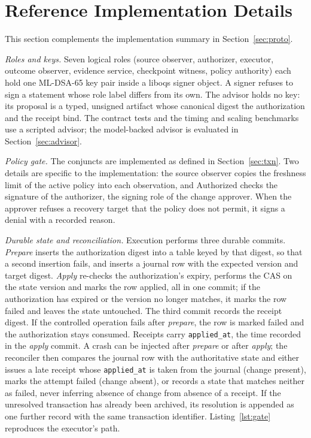 \documentclass[journal]{IEEEtran}
\newcommand{\Authorized}{\mathrm{Authorized}}
\newcommand{\code}[1]{\texttt{\footnotesize #1}}
\begin{document}
\section{Reference Implementation Details}
\label{s:impl}
This section complements the implementation summary in Section~\ref{sec:proto}.

\emph{Roles and keys.} Seven logical roles (source observer, authorizer, executor, outcome observer, evidence service, checkpoint witness, policy authority) each hold one ML-DSA-65 key pair inside a liboqs signer object. A signer refuses to sign a statement whose role label differs from its own. The advisor holds no key: its proposal is a typed, unsigned artifact whose canonical digest the authorization and the receipt bind. The contract tests and the timing and scaling benchmarks use a scripted advisor; the model-backed advisor is evaluated in Section~\ref{sec:advisor}.

\emph{Policy gate.} The conjuncts are implemented as defined in Section~\ref{sec:txn}. Two details are specific to the implementation: the source observer copies the freshness limit of the active policy into each observation, and $\Authorized$ checks the signature of the authorizer, the signing role of the change approver. When the approver refuses a recovery target that the policy does not permit, it signs a denial with a recorded reason.

\emph{Durable state and reconciliation.} Execution performs three durable commits. \emph{Prepare} inserts the authorization digest into a table keyed by that digest, so that a second insertion fails, and inserts a journal row with the expected version and target digest. \emph{Apply} re-checks the authorization's expiry, performs the CAS on the state version and marks the row applied, all in one commit; if the authorization has expired or the version no longer matches, it marks the row failed and leaves the state untouched. The third commit records the receipt digest. If the controlled operation fails after \emph{prepare}, the row is marked failed and the authorization stays consumed. Receipts carry \code{applied\_at}, the time recorded in the \emph{apply} commit. A crash can be injected after \emph{prepare} or after \emph{apply}; the reconciler then compares the journal row with the authoritative state and either issues a late receipt whose \code{applied\_at} is taken from the journal (change present), marks the attempt failed (change absent), or records a state that matches neither as failed, never inferring absence of change from absence of a receipt. If the unresolved transaction has already been archived, its resolution is appended as one further record with the same transaction identifier. Listing~\ref{lst:gate} reproduces the executor's path.
\end{document}
